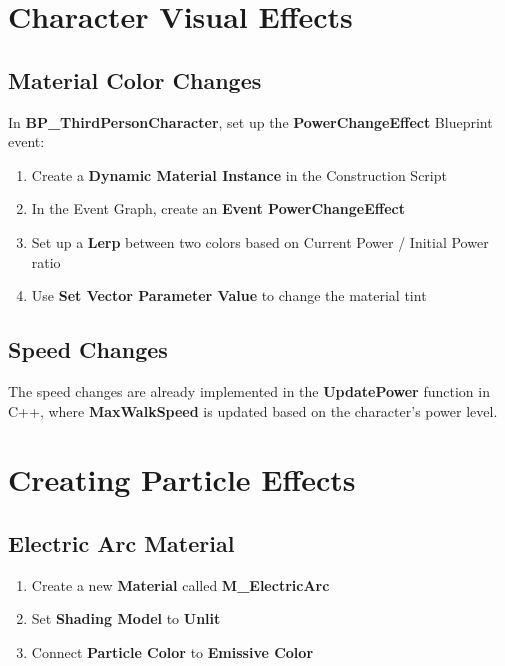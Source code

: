 \documentclass[
  letterpaper,
  DIV=11,
  numbers=noendperiod]{scrartcl}
\providecommand{\tightlist}{%
  \setlength{\itemsep}{0pt}\setlength{\parskip}{0pt}}
\begin{document}
\section{Character Visual Effects}\label{character-visual-effects}

\subsection{Material Color Changes}\label{material-color-changes}

In \textbf{BP\_ThirdPersonCharacter}, set up the
\textbf{PowerChangeEffect} Blueprint event:

\begin{enumerate}
\def\labelenumi{\arabic{enumi}.}
\tightlist
\item
  Create a \textbf{Dynamic Material Instance} in the Construction Script
\item
  In the Event Graph, create an \textbf{Event PowerChangeEffect}
\item
  Set up a \textbf{Lerp} between two colors based on Current Power /
  Initial Power ratio
\item
  Use \textbf{Set Vector Parameter Value} to change the material tint
\end{enumerate}

\subsection{Speed Changes}\label{speed-changes}

The speed changes are already implemented in the \textbf{UpdatePower}
function in C++, where \textbf{MaxWalkSpeed} is updated based on the
character's power level.

\section{Creating Particle Effects}\label{creating-particle-effects}

\subsection{Electric Arc Material}\label{electric-arc-material}

\begin{enumerate}
\def\labelenumi{\arabic{enumi}.}
\tightlist
\item
  Create a new \textbf{Material} called \textbf{M\_ElectricArc}
\item
  Set \textbf{Shading Model} to \textbf{Unlit}
\item
  Connect \textbf{Particle Color} to \textbf{Emissive Color}
\end{enumerate}
\end{document}
